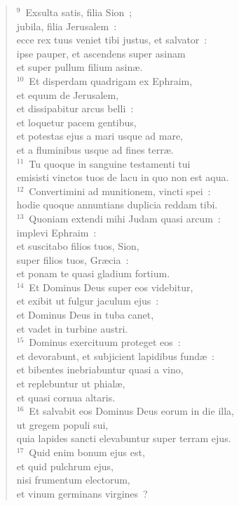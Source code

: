 \begin{verse}${}^{9}$~Exsulta satis, filia Sion~;\\ jubila, filia Jerusalem~:\\ ecce rex tuus veniet tibi justus, et salvator~:\\ ipse pauper, et ascendens super asinam\\ et super pullum filium asin\ae .\\
${}^{10}$~Et disperdam quadrigam ex Ephraim,\\ et equum de Jerusalem,\\ et dissipabitur arcus belli~:\\ et loquetur pacem gentibus,\\ et potestas ejus a mari usque ad mare,\\ et a fluminibus usque ad fines terr\ae .\\
${}^{11}$~Tu quoque in sanguine testamenti tui\\ emisisti vinctos tuos de lacu in quo non est aqua.\\
${}^{12}$~Convertimini ad munitionem, vincti spei~:\\ hodie quoque annuntians duplicia reddam tibi.\\
${}^{13}$~Quoniam extendi mihi Judam quasi arcum~:\\ implevi Ephraim~:\\ et suscitabo filios tuos, Sion,\\ super filios tuos, Gr\ae cia~:\\ et ponam te quasi gladium fortium.\\
${}^{14}$~Et Dominus Deus super eos videbitur,\\ et exibit ut fulgur jaculum ejus~:\\ et Dominus Deus in tuba canet,\\ et vadet in turbine austri.\\
${}^{15}$~Dominus exercituum proteget eos~:\\ et devorabunt, et subjicient lapidibus fund\ae~:\\ et bibentes inebriabuntur quasi a vino,\\ et replebuntur ut phial\ae ,\\ et quasi cornua altaris.\\
${}^{16}$~Et salvabit eos Dominus Deus eorum in die illa,\\ ut gregem populi sui,\\ quia lapides sancti elevabuntur super terram ejus.\\
${}^{17}$~Quid enim bonum ejus est,\\ et quid pulchrum ejus,\\ nisi frumentum electorum,\\ et vinum germinans virgines~?\end{verse}


